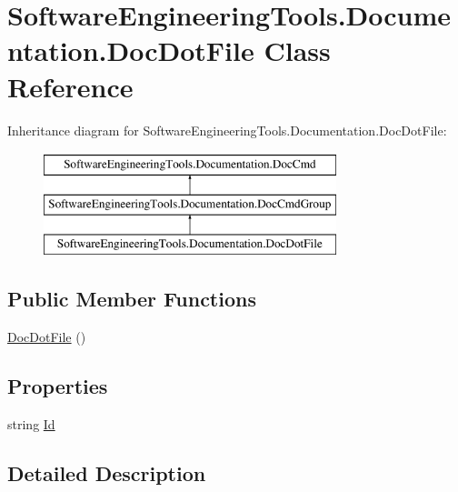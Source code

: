 \hypertarget{class_software_engineering_tools_1_1_documentation_1_1_doc_dot_file}{\section{Software\+Engineering\+Tools.\+Documentation.\+Doc\+Dot\+File Class Reference}
\label{class_software_engineering_tools_1_1_documentation_1_1_doc_dot_file}
}
Inheritance diagram for Software\+Engineering\+Tools.\+Documentation.\+Doc\+Dot\+File\+:\begin{figure}[H]
\begin{center}
\leavevmode
\includegraphics[height=3.000000cm]{class_software_engineering_tools_1_1_documentation_1_1_doc_dot_file}
\end{center}
\end{figure}
\subsection*{Public Member Functions}
\begin{DoxyCompactItemize}
\item 
\hyperlink{class_software_engineering_tools_1_1_documentation_1_1_doc_dot_file_ae447910a47c25d6a8bdce0b849367fe9}{Doc\+Dot\+File} ()
\end{DoxyCompactItemize}
\subsection*{Properties}
\begin{DoxyCompactItemize}
\item 
string \hyperlink{class_software_engineering_tools_1_1_documentation_1_1_doc_dot_file_ac362448a9bea0682d1f2aa7887e75e11}{Id}
\end{DoxyCompactItemize}


\subsection{Detailed Description}


